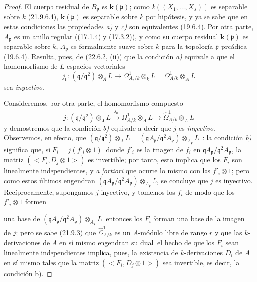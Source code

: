\begin{proof}
El cuerpo residual de $B_{\mathfrak p}$ es $\boldsymbol{k}(\mathfrak p)$; como
$k((X_1,\ldots,X_s))$ es separable sobre $k$ (21.9.6.4), $\boldsymbol{k}(\mathfrak p)$ es
separable sobre $k$ por hipótesis, y ya se sabe que en estas condiciones las
propiedades \emph{a)} y \emph{c)} son equivalentes (19.6.4). Por otra parte,
$A_{\mathfrak p}$ es un anillo regular ((17.1.4) y (17.3.2)), y como su
cuerpo residual $\boldsymbol{k}(\mathfrak p)$ es separable sobre $k$, $A_{\mathfrak p}$ es
formalmente suave sobre $k$ para la topología $\mathfrak p$-preádica
(19.6.4). Resulta, pues, de (22.6.2, (ii)) que la condición \emph{a)} equivale a que
el homomorfismo de $L$-espacios vectoriales
\begin{equation}
\label{0.22.7.2.1-fr}
  j_0:(\mathfrak q/\mathfrak q^2)\otimes_AL
  \longrightarrow\Omega^1_{A_{\mathfrak p}/k}\otimes_kL
  =\Omega^1_{A/k}\otimes_AL
  \tag{22.7.2.1}
\end{equation}
sea \emph{inyectivo}.

Consideremos, por otra parte, el homomorfismo compuesto
\begin{equation}
\label{0.22.7.2.2-fr}
  j:(\mathfrak q/\mathfrak q^2)\otimes_AL
  \xrightarrow{j_0}\Omega^1_{A/k}\otimes_AL
  \longrightarrow\widehat\Omega^1_{A/k}\otimes_AL
  \tag{22.7.2.2}
\end{equation}
y demostremos que la condición \emph{b)} equivale a decir que $j$ es \emph{inyectivo}. Observemos, en
efecto, que
$(\mathfrak q/\mathfrak q^2)\otimes_AL
=(\mathfrak qA_{\mathfrak p}/\mathfrak q^2A_{\mathfrak p})
\otimes_{A_{\mathfrak p}}L$~;
la condición \emph{b)} significa que, si $F_i=j(f'_i\otimes1)$, donde $f'_i$ es la imagen
de $f_i$ en
$\mathfrak qA_{\mathfrak p}/\mathfrak q^2A_{\mathfrak p}$, la matriz
$(\mathopen{<}F_i,D_j\otimes1\mathclose{>})$ es invertible; por tanto, esto implica que los
$F_i$ son linealmente independientes, y \emph{a fortiori} que ocurre lo
mismo con los $f'_i\otimes1$; pero como estos últimos engendran
$(\mathfrak qA_{\mathfrak p}/\mathfrak q^2A_{\mathfrak p})
\otimes_{A_{\mathfrak p}}L$, se concluye que $j$ es inyectivo. Recíprocamente,
supongamos $j$ inyectivo, y tomemos los $f_i$ de modo que los $f'_i\otimes1$
formen


una base de
$(\mathfrak qA_{\mathfrak p}/\mathfrak q^2A_{\mathfrak p})
\otimes_{A_{\mathfrak p}}L$; entonces los $F_i$ forman una base de la imagen de
$j$; pero se sabe (21.9.3) que $\widehat\Omega^1_{A/k}$ es un $A$-módulo
libre de rango $r$ y que las $k$-derivaciones de $A$ en sí mismo engendran su
dual; el hecho de que los $F_i$ sean linealmente independientes implica, pues,
la existencia de $k$-derivaciones $D_i$ de $A$ en sí mismo tales que la matriz
$(\mathopen{<}F_i,D_j\otimes1\mathclose{>})$ sea invertible, es decir, la condición
b).


\end{proof}
